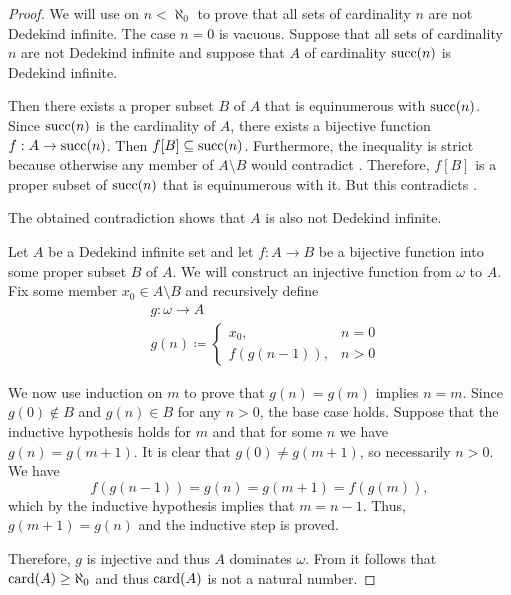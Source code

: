 \begin{proof}
   We will use  on \( n < \aleph_0 \) to prove that all sets of cardinality \( n \) are not Dedekind infinite. The case \( n = 0 \) is vacuous. Suppose that all sets of cardinality \( n \) are not Dedekind infinite and suppose that \( A \) of cardinality \( \operatorname{succ}(n) \) is Dedekind infinite.

  Then there exists a proper subset \( B \) of \( A \) that is equinumerous with \( \operatorname{succ}(n) \). Since \( \operatorname{succ}(n) \) is the cardinality of \( A \), there exists a bijective function \( f: A \to \operatorname{succ}(n) \). Then \( f[B] \subseteq \operatorname{succ}(n) \). Furthermore, the inequality is strict because otherwise any member of \( A \setminus B \) would contradict . Therefore, \( f[B] \) is a proper subset of \( \operatorname{succ}(n) \) that is equinumerous with it. But this contradicts .

  The obtained contradiction shows that \( A \) is also not Dedekind infinite.

   Let \( A \) be a Dedekind infinite set and let \( f: A \to B \) be a bijective function into some proper subset \( B \) of \( A \). We will construct an injective function from \( \omega \) to \( A \). Fix some member \( x_0 \in A \setminus B \) and recursively define
  \begin{equation*}
    \begin{aligned}
      &g: \omega \to A \\
      &g(n) \coloneqq \begin{cases}
        x_0,         &n = 0 \\
        f(g(n - 1)), &n > 0
      \end{cases}
    \end{aligned}
  \end{equation*}

  We now use induction on \( m \) to prove that \( g(n) = g(m) \) implies \( n = m \). Since \( g(0) \not\in B \) and \( g(n) \in B \) for any \( n > 0 \), the base case holds. Suppose that the inductive hypothesis holds for \( m \) and that for some \( n \) we have \( g(n) = g(m + 1) \). It is clear that \( g(0) \neq g(m + 1) \), so necessarily \( n > 0 \). We have
  \begin{equation*}
    f(g(n - 1))
    =
    g(n)
    =
    g(m + 1)
    =
    f(g(m)),
  \end{equation*}
  which by the inductive hypothesis implies that \( m = n - 1 \). Thus, \( g(m + 1) = g(n) \) and the inductive step is proved.

  Therefore, \( g \) is injective and thus \( A \) dominates \( \omega \). From  it follows that \( \operatorname{card}(A) \geq \aleph_0 \) and thus \( \operatorname{card}(A) \) is not a natural number.
\end{proof}

